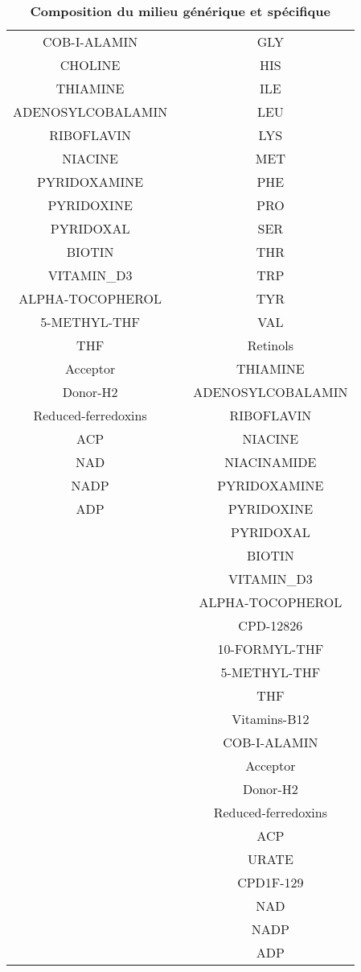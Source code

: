 \documentclass[../main.tex]{subfiles}
\begin{document}
\begin{table}[H]
\begin{adjustbox}{width=0.43\textwidth}
\begin{tabular}{|c|c|c|}
COB-I-ALAMIN	& &	GLY \\
CHOLINE	& &	HIS \\
THIAMINE	& &	ILE \\
ADENOSYLCOBALAMIN	& &	LEU \\
RIBOFLAVIN	& &	LYS \\
NIACINE	& &	MET \\
PYRIDOXAMINE	& &	PHE \\
PYRIDOXINE	& &	PRO \\
PYRIDOXAL	& &	SER \\
BIOTIN	& &	THR \\
VITAMIN\_D3	& &	TRP \\
ALPHA-TOCOPHEROL	& &	TYR \\
5-METHYL-THF	& &	VAL \\
THF	& &	Retinols \\
Acceptor	& &	THIAMINE \\
Donor-H2		& & ADENOSYLCOBALAMIN \\
Reduced-ferredoxins & &		RIBOFLAVIN \\
ACP	& &	NIACINE \\
NAD	& &	NIACINAMIDE \\
NADP	& &	PYRIDOXAMINE \\
ADP	& &	PYRIDOXINE \\
 &	&	PYRIDOXAL \\
	& &	BIOTIN \\
& &		VITAMIN\_D3 \\
	& &	ALPHA-TOCOPHEROL \\
& &		CPD-12826 \\
& &		10-FORMYL-THF \\
& &		5-METHYL-THF \\
& &		THF \\
& &		Vitamins-B12 \\
& &		COB-I-ALAMIN \\
& &		Acceptor \\
& &		Donor-H2 \\
& &		Reduced-ferredoxins \\
& &		ACP \\
& &		URATE \\
& &		CPD1F-129 \\
& &		NAD \\
& &		NADP \\
& & 	ADP \\
 \hline
\end{tabular}
\end{adjustbox}
\caption{\textbf{Composition du milieu générique et spécifique}}
\label{graine-specific-generic}
\end{table}
\end{document}
